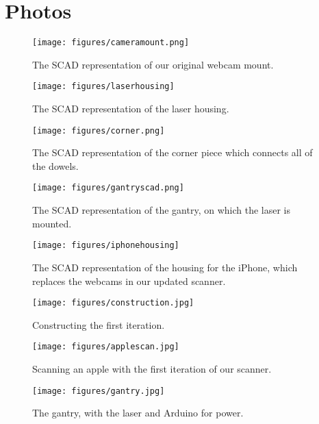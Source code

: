 \documentclass[12pt, letterpaper]{article}
\begin{document}
\appendix
\section{Photos}
\begin{figure}[ht]
    \centering
    \texttt{[image: figures/cameramount.png]}
    \caption{The SCAD representation of our original webcam mount.}
\end{figure}

\begin{figure}[ht]
    \centering
    \texttt{[image: figures/laserhousing]}
    \caption{The SCAD representation of the laser housing.}
\end{figure}

\begin{figure}[ht]
    \centering
    \texttt{[image: figures/corner.png]}
    \caption{The SCAD representation of the corner piece which connects all of
    the dowels.}
\end{figure}

\begin{figure}[ht]
    \centering
    \texttt{[image: figures/gantryscad.png]}
    \caption{The SCAD representation of the gantry, on which the laser is mounted.}
\end{figure}

\begin{figure}[ht]
    \centering
    \texttt{[image: figures/iphonehousing]}
    \caption{The SCAD representation of the housing for the iPhone, which replaces
    the webcams in our updated scanner.}
\end{figure}

\begin{figure}[ht]
    \centering
    \texttt{[image: figures/construction.jpg]}
    \caption{Constructing the first iteration.}
\end{figure}

\begin{figure}[ht]
    \centering
    \texttt{[image: figures/applescan.jpg]}
    \caption{Scanning an apple with the first iteration of our scanner.}
\end{figure}

\begin{figure}[ht]
    \centering
    \texttt{[image: figures/gantry.jpg]}
    \caption{The gantry, with the laser and Arduino for power.}
\end{figure}
\end{document}
